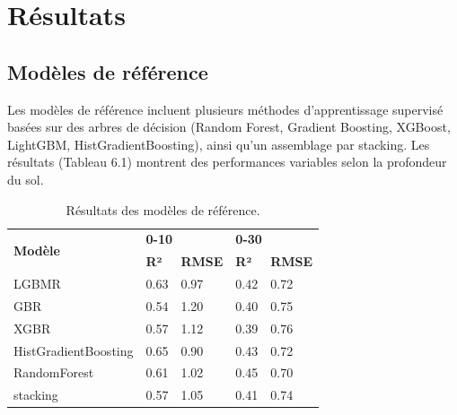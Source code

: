 \documentclass[12pt,a4paper,oneside]{report}
\begin{document}
\chapter{Résultats}

\section{Modèles de référence}
Les modèles de référence incluent plusieurs méthodes d’apprentissage supervisé basées sur des arbres de décision (Random Forest, Gradient Boosting, XGBoost, LightGBM, HistGradientBoosting), ainsi qu’un assemblage par stacking. Les résultats (Tableau 6.1) montrent des performances variables selon la profondeur du sol.
\begin{table}[h]
\centering
\begin{tabular}{l l l l l}
\toprule
\multirow{2}{*}{\textbf{Modèle}} & \multicolumn{2}{l}{\textbf{0-10}} & \multicolumn{2}{l}{\textbf{0-30}} \\
\cmidrule(lr){2-3} \cmidrule(lr){4-5}
& \textbf{R²} & \textbf{RMSE} & \textbf{R²} & \textbf{RMSE} \\
\midrule
LGBMR & 0.63 & 0.97 &0.42 &0.72 \\
GBR & 0.54 & 1.20 & 0.40 &0.75 \\
XGBR & 0.57 & 1.12 & 0.39 &0.76 \\
HistGradientBoosting & 0.65 & 0.90 & 0.43 &0.72 \\
RandomForest & 0.61 & 1.02 & 0.45 &0.70 \\
stacking & 0.57 & 1.05 & 0.41 &0.74 \\

\bottomrule
\end{tabular}
\caption{Résultats des modèles de référence.}
\end{table}
\end{document}
